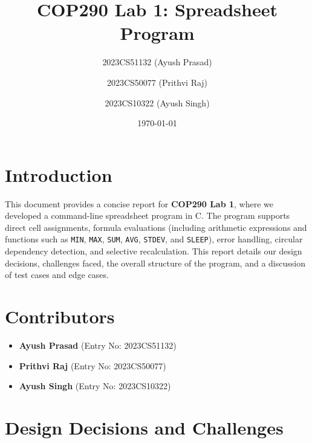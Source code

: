 \documentclass[11pt,a4paper]{article}
\title{COP290 Lab 1: Spreadsheet Program}
\author{2023CS51132 (Ayush Prasad) \and 2023CS50077 (Prithvi Raj) \and 2023CS10322 (Ayush Singh)}
\date{\today}
\begin{document}
\maketitle

\section{Introduction}
This document provides a concise report for \textbf{COP290 Lab 1}, where we developed a command-line spreadsheet program in C. The program supports direct cell assignments, formula evaluations (including arithmetic expressions and functions such as \texttt{MIN}, \texttt{MAX}, \texttt{SUM}, \texttt{AVG}, \texttt{STDEV}, and \texttt{SLEEP}), error handling, circular dependency detection, and selective recalculation. This report details our design decisions, challenges faced, the overall structure of the program, and a discussion of test cases and edge cases.

\section{Contributors}
\begin{itemize}[noitemsep]
    \item \textbf{Ayush Prasad} (Entry No: 2023CS51132)
    \item \textbf{Prithvi Raj} (Entry No: 2023CS50077)
    \item \textbf{Ayush Singh} (Entry No: 2023CS10322)
\end{itemize}

\section{Design Decisions and Challenges}
\end{document}
